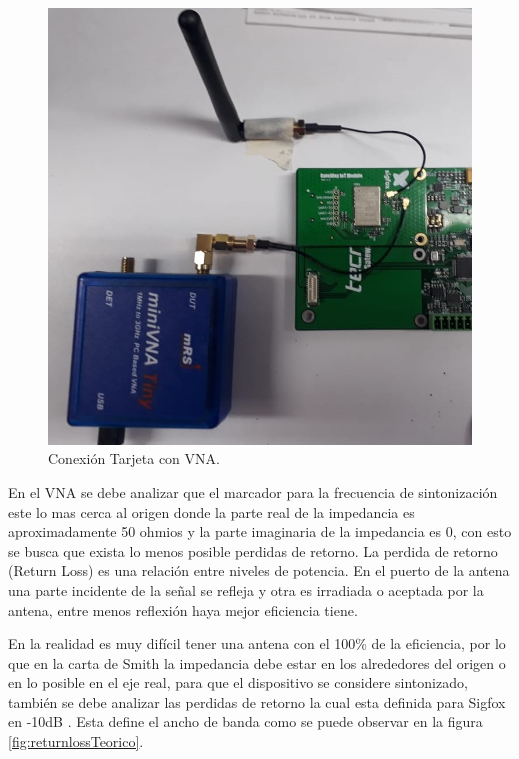 \begin{figure}[h]
	\centering
	\includegraphics[scale=.45]{./Figures/VNATunnig.jpeg}
	\caption{Conexión Tarjeta con VNA.}
	\label{fig:VNATunnig}
\end{figure}

En el VNA se debe analizar que el marcador para la frecuencia de sintonización este lo mas cerca al origen donde la parte real de la impedancia es aproximadamente 50 ohmios y la parte imaginaria de la impedancia es 0, con esto se busca que exista lo menos posible perdidas de retorno. La perdida de retorno (Return Loss) es una relación entre niveles de potencia. En el puerto de la antena una parte incidente de la señal se refleja y otra es irradiada  o aceptada por la antena, entre menos reflexión haya mejor eficiencia tiene.

En la realidad es muy difícil tener una antena con el 100\% de la eficiencia, por lo que en la carta de Smith la impedancia debe estar en los alrededores del origen o en lo posible en el eje real, para que el dispositivo se considere sintonizado, también se debe analizar las perdidas de retorno la cual esta definida para Sigfox en -10dB \citep{AntenaSigFox2016}. Esta define el ancho de banda como se puede observar en la figura \ref{fig:returnlossTeorico}.

